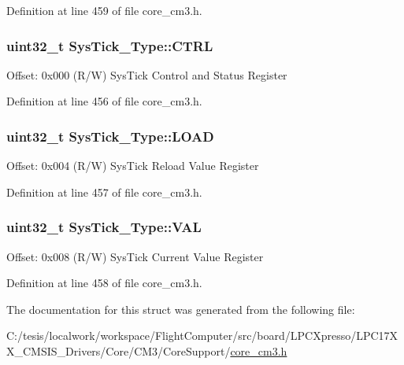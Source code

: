 \-Definition at line 459 of file core\-\_\-cm3.\-h.

\hypertarget{struct_sys_tick___type_af2ad94ac83e5d40fc6e34884bc1bec5f}{
\subsubsection[{\-C\-T\-R\-L}]{ uint32\-\_\-t {\bf \-Sys\-Tick\-\_\-\-Type\-::\-C\-T\-R\-L}}}\label{struct_sys_tick___type_af2ad94ac83e5d40fc6e34884bc1bec5f}
\-Offset\-: 0x000 (\-R/\-W) \-Sys\-Tick \-Control and \-Status \-Register 

\-Definition at line 456 of file core\-\_\-cm3.\-h.

\hypertarget{struct_sys_tick___type_ae7bc9d3eac1147f3bba8d73a8395644f}{
\subsubsection[{\-L\-O\-A\-D}]{ uint32\-\_\-t {\bf \-Sys\-Tick\-\_\-\-Type\-::\-L\-O\-A\-D}}}\label{struct_sys_tick___type_ae7bc9d3eac1147f3bba8d73a8395644f}
\-Offset\-: 0x004 (\-R/\-W) \-Sys\-Tick \-Reload \-Value \-Register 

\-Definition at line 457 of file core\-\_\-cm3.\-h.

\hypertarget{struct_sys_tick___type_a0997ff20f11817f8246e8f0edac6f4e4}{
\subsubsection[{\-V\-A\-L}]{ uint32\-\_\-t {\bf \-Sys\-Tick\-\_\-\-Type\-::\-V\-A\-L}}}\label{struct_sys_tick___type_a0997ff20f11817f8246e8f0edac6f4e4}
\-Offset\-: 0x008 (\-R/\-W) \-Sys\-Tick \-Current \-Value \-Register 

\-Definition at line 458 of file core\-\_\-cm3.\-h.



\-The documentation for this struct was generated from the following file\-:\begin{DoxyCompactItemize}
\item 
\-C\-:/tesis/localwork/workspace/\-Flight\-Computer/src/board/\-L\-P\-C\-Xpresso/\-L\-P\-C17\-X\-X\-\_\-\-C\-M\-S\-I\-S\-\_\-\-Drivers/\-Core/\-C\-M3/\-Core\-Support/\hyperlink{core__cm3_8h}{core\-\_\-cm3.\-h}\end{DoxyCompactItemize}
